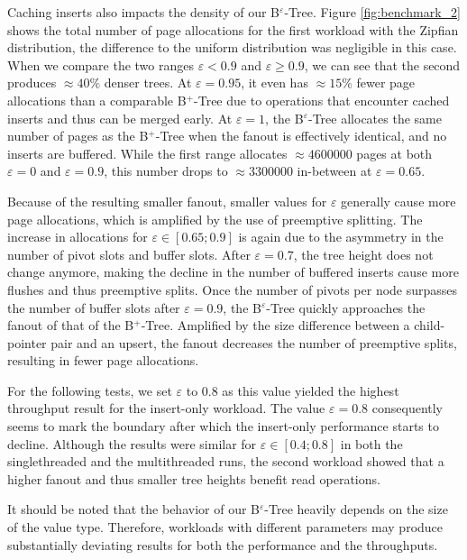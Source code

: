 Caching inserts also impacts the density of our B$^\varepsilon$-Tree. Figure \ref{fig:benchmark_2} shows the total number of page allocations for the first workload with the Zipfian distribution, the difference to the uniform distribution was negligible in this case. When we compare the two ranges $\varepsilon < 0.9$ and $\varepsilon \ge 0.9$, we can see that the second produces $\approx 40\%$ denser trees. At $\varepsilon=0.95$, it even has $\approx 15\%$ fewer page allocations than a comparable B$^+$-Tree due to operations that encounter cached inserts and thus can be merged early. At $\varepsilon=1$, the B$^\varepsilon$-Tree allocates the same number of pages as the B$^+$-Tree when the fanout is effectively identical, and no inserts are buffered. While the first range allocates $\approx 4600000$ pages at both $\varepsilon=0$ and $\varepsilon=0.9$, this number drops to $\approx 3300000$ in-between at $\varepsilon=0.65$.

Because of the resulting smaller fanout, smaller values for $\varepsilon$ generally cause more page allocations, which is amplified by the use of preemptive splitting. The increase in allocations for $\varepsilon \in [0.65; 0.9]$ is again due to the asymmetry in the number of pivot slots and buffer slots. After $\varepsilon=0.7$, the tree height does not change anymore, making the decline in the number of buffered inserts cause more flushes and thus preemptive splits. Once the number of pivots per node surpasses the number of buffer slots after $\varepsilon=0.9$, the B$^\varepsilon$-Tree quickly approaches the fanout of that of the B$^+$-Tree. Amplified by the size difference between a child-pointer pair and an upsert, the fanout decreases the number of preemptive splits, resulting in fewer page allocations.

For the following tests, we set $\varepsilon$ to 0.8 as this value yielded the highest throughput result for the insert-only workload. The value $\varepsilon=0.8$ consequently seems to mark the boundary after which the insert-only performance starts to decline. Although the results were similar for $\varepsilon \in [0.4; 0.8]$ in both the singlethreaded and the multithreaded runs, the second workload showed that a higher fanout and thus smaller tree heights benefit read operations.

It should be noted that the behavior of our B$^\varepsilon$-Tree heavily depends on the size of the value type. Therefore, workloads with different parameters may produce substantially deviating results for both the performance and the throughputs.

